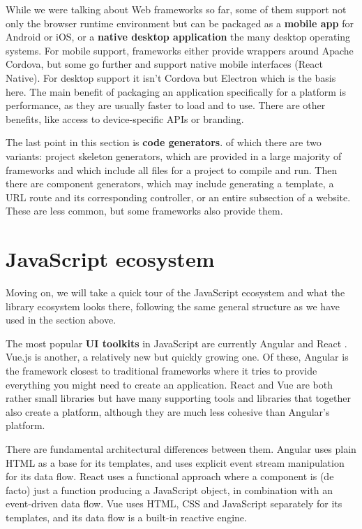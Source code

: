 \documentclass[english,odsaz]{fitthesis}
\begin{document}
While we were talking about Web frameworks so far, some of them support not only
the browser runtime environment but can be packaged as a \textbf{mobile app} for Android
or iOS, or a \textbf{native desktop application} the many desktop operating systems. For
mobile support, frameworks either provide wrappers around Apache Cordova, but
some go further and support native mobile interfaces (React Native). For desktop
support it isn't Cordova but Electron which is the basis here. The main benefit
of packaging an application specifically for a platform is performance, as they
are usually faster to load and to use. There are other benefits, like access to
device-specific APIs or branding.

The last point in this section is \textbf{code generators}. of which there are two
variants: project skeleton generators, which are provided in a large majority of
frameworks and which include all files for a project to compile and run. Then
there are component generators, which may include generating a template, a URL
route and its corresponding controller, or an entire subsection of a
website. These are less common, but some frameworks also provide them.

\section{JavaScript ecosystem}
\label{sec:org1e5e22b}
Moving on, we will take a quick tour of the JavaScript ecosystem and what the
library ecosystem looks there, following the same general structure as we have
used in the section above.

The most popular \textbf{UI toolkits} in JavaScript are currently Angular \cite{angular} and
React \cite{react}. Vue.js \cite{vuejs} is another, a relatively new but quickly growing one. Of these,
Angular is the framework closest to traditional frameworks where it tries to
provide everything you might need to create an application. React and Vue are
both rather small libraries but have many supporting tools and libraries that
together also create a platform, although they are much less cohesive than Angular's
platform.

There are fundamental architectural differences between them. Angular uses plain
HTML as a base for its templates, and uses explicit event stream manipulation
for its data flow. React uses a functional approach where a component is (de
facto) just a function producing a JavaScript object, in combination with an
event-driven data flow. Vue uses HTML, CSS and JavaScript separately for its
templates, and its data flow is a built-in reactive engine.
\end{document}
